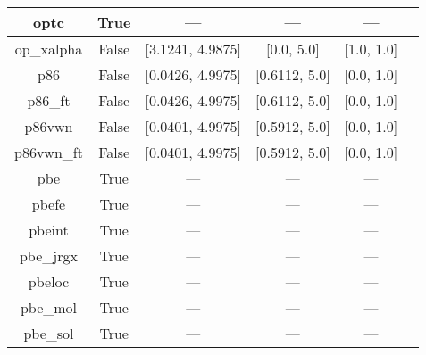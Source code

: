 \begin{tabular}{|c|c|c|c|c|l|}
          optc &                  True &              --- &              --- &              --- &                                           \cite{Cohen2001_607} \\ \hline
    op\_xalpha &                 False & [3.1241, 4.9875] &       [0.0, 5.0] &       [1.0, 1.0] &                      \cite{Tsuneda1999_10664,Tsuneda1999_5656} \\ \hline
           p86 &                 False & [0.0426, 4.9975] &    [0.6112, 5.0] &       [0.0, 1.0] &                                         \cite{Perdew1986_8822} \\ \hline
       p86\_ft &                 False & [0.0426, 4.9975] &    [0.6112, 5.0] &       [0.0, 1.0] &                                         \cite{Perdew1986_8822} \\ \hline
        p86vwn &                 False & [0.0401, 4.9975] &    [0.5912, 5.0] &       [0.0, 1.0] &                                         \cite{Perdew1986_8822} \\ \hline
    p86vwn\_ft &                 False & [0.0401, 4.9975] &    [0.5912, 5.0] &       [0.0, 1.0] &                                         \cite{Perdew1986_8822} \\ \hline
           pbe &                  True &              --- &              --- &              --- &                     \cite{Perdew1996_3865,Perdew1996_3865_err} \\ \hline
         pbefe &                  True &              --- &              --- &              --- &                                          \cite{Perez2015_3844} \\ \hline
        pbeint &                  True &              --- &              --- &              --- &                                      \cite{Fabiano2010_113104} \\ \hline
     pbe\_jrgx &                  True &              --- &              --- &              --- &                                      \cite{Pedroza2009_201106} \\ \hline
        pbeloc &                  True &              --- &              --- &              --- &                                   \cite{Constantin2012_035130} \\ \hline
      pbe\_mol &                  True &              --- &              --- &              --- &                                     \cite{delCampo2012_104108} \\ \hline
      pbe\_sol &                  True &              --- &              --- &              --- &                                       \cite{Perdew2008_136406} \\ \hline

\end{tabular}
